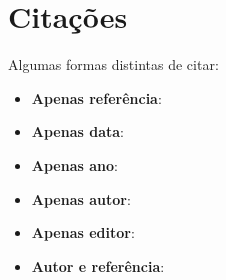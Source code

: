 
\section{Citações}

Algumas formas distintas de citar:

\begin{itemize}
    \item \textbf{Apenas referência}:~\cite{rfc44}
    \item \textbf{Apenas data}:~
    \item \textbf{Apenas ano}:~\citeyear{rfc44}
    \item \textbf{Apenas autor}:~\citeauthor{rfc44}
    \item \textbf{Apenas editor}:
    \item \textbf{Autor e referência}:\citet{rfc44}
\end{itemize}
